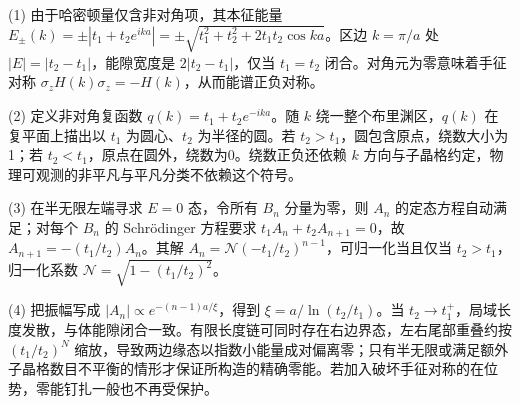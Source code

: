 (1) 由于哈密顿量仅含非对角项，其本征能量 \(E_\pm(k)=\pm|t_1+t_2e^{ika}|=\pm\sqrt{t_1^2+t_2^2+2t_1t_2\cos ka}\)。区边 \(k=\pi/a\) 处 \(|E|=|t_2-t_1|\)，能隙宽度是 \(2|t_2-t_1|\)，仅当 \(t_1=t_2\) 闭合。对角元为零意味着手征对称 \(\sigma_zH(k)\sigma_z=-H(k)\)，从而能谱正负对称。

(2) 定义非对角复函数 \(q(k)=t_1+t_2e^{-ika}\)。随 \(k\) 绕一整个布里渊区，\(q(k)\) 在复平面上描出以 \(t_1\) 为圆心、\(t_2\) 为半径的圆。若 \(t_2>t_1\)，圆包含原点，绕数大小为1；若 \(t_2<t_1\)，原点在圆外，绕数为0。绕数正负还依赖 \(k\) 方向与子晶格约定，物理可观测的非平凡与平凡分类不依赖这个符号。

(3) 在半无限左端寻求 \(E=0\) 态，令所有 \(B_n\) 分量为零，则 \(A_n\) 的定态方程自动满足；对每个 \(B_n\) 的 Schrödinger 方程要求 \(t_1 A_n+t_2 A_{n+1}=0\)，故 \(A_{n+1}=-(t_1/t_2)A_n\)。其解 \(A_n=\mathcal N(-t_1/t_2)^{n-1}\)，可归一化当且仅当 \(t_2>t_1\)，归一化系数 \(\mathcal N=\sqrt{1-(t_1/t_2)^2}\)。

(4) 把振幅写成 \(|A_n|\propto e^{-(n-1)a/\xi}\)，得到 \(\xi=a/\ln(t_2/t_1)\)。当 \(t_2\to t_1^+\)，局域长度发散，与体能隙闭合一致。有限长度链可同时存在右边界态，左右尾部重叠约按 \((t_1/t_2)^N\) 缩放，导致两边缘态以指数小能量成对偏离零；只有半无限或满足额外子晶格数目不平衡的情形才保证所构造的精确零能。若加入破坏手征对称的在位势，零能钉扎一般也不再受保护。
